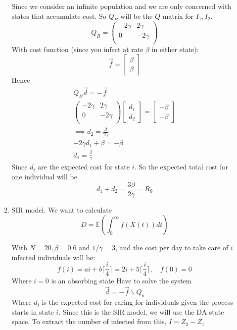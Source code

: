 \documentclass{/home/janmebows/Documents/LatexTemplates/myassignment}
\begin{document}
\begin{enumerate}
\begin{enumerate}[label=(\roman*)]
				Since we consider an infinite population and we are only concerned with states that accumulate cost. So $Q_B$ will be the $Q$ matrix for $I_1,I_2$.
				\[Q_B = \begin{pmatrix}
					-2 \gamma& 2 \gamma\\
					0 & -2 \gamma\\
				\end{pmatrix}\]
				With cost function (since you infect at rate $\beta$ in either state):
				\[\vec f = \begin{bmatrix}
					\beta\\ \beta
				\end{bmatrix}\]
				Hence
				\begin{align*}
					Q_B \vec d = -\vec f\\
					\begin{pmatrix}
					-2 \gamma& 2 \gamma\\
					0 & -2 \gamma\\
					\end{pmatrix} \begin{bmatrix}
						d_1\\d_2
					\end{bmatrix} = \begin{bmatrix}
					-\beta\\ -\beta
				\end{bmatrix}\\
				\implies d_2 = \frac{\beta}{2\gamma}\\
				-2 \gamma d_1 +\beta = -\beta\\
				d_1 = \frac{\beta}{\gamma}
				\end{align*}
				Since $d_i$ are the expected cost for state $i$. So the expected total cost for one individual will be
				\[d_1 + d_2 = \frac{3 \beta}{2 \gamma} = R_0\]
		\item %
				SIR model. We want to calculate 
				\[D = \mathbb{E}\left(\int_0^\infty f(X(t)) dt\right)\]
			 							
			With $N=20, \beta = 0.6$ and $1/\gamma = 3$, and the cost per day to take care of $i$ infected individuals will be:
			\[f(i) = ai + b\lceil\frac{i}{4}\rceil = 2i + 5\lceil\frac{i}{4}\rceil,\quad f(0) =0  \]
			Where $i=0$ is an absorbing state
			Have to solve the system 
			\[\vec d = -\vec f \backslash Q_b\]
			Where $d_i$ is the expected cost for caring for individuals given the process starts in state $i$.
			Since this is the SIR model, we will use the DA state space. To extract the number of infected from this, $I = Z_2 - Z_1$

	\end{enumerate}
\end{enumerate}
\end{document}
